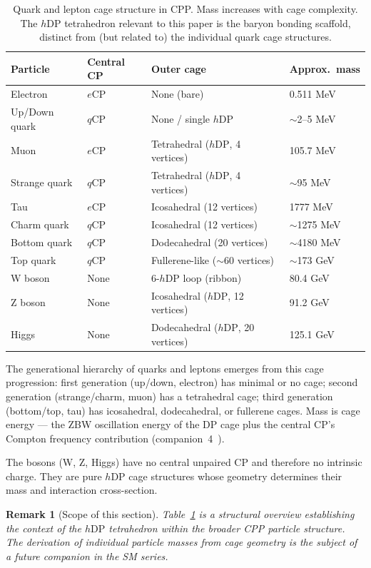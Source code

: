 \documentclass[12pt]{article}
\newtheorem{remark}[theorem]{Remark}
\newcommand{\eCP}{e\mathrm{CP}}
\newcommand{\qCP}{q\mathrm{CP}}
\newcommand{\hDP}{h\mathrm{DP}}
\begin{document}
\begin{table}[h]
\centering
\caption{Quark and lepton cage structure in CPP.  Mass increases
with cage complexity.  The $\hDP$ tetrahedron relevant to this
paper is the baryon bonding scaffold, distinct from (but related
to) the individual quark cage structures.}
\label{tab:cages}
\renewcommand{\arraystretch}{1.3}
\begin{tabular}{@{}llll@{}}
\toprule
Particle & Central CP & Outer cage & Approx.\ mass \\
\midrule
Electron & $\eCP$ & None (bare) & 0.511 MeV \\
Up/Down quark & $\qCP$ & None / single $\hDP$ & $\sim$2--5 MeV \\
Muon & $\eCP$ & Tetrahedral ($\hDP$, 4 vertices) & 105.7 MeV \\
Strange quark & $\qCP$ & Tetrahedral ($\hDP$, 4 vertices) & $\sim$95 MeV \\
Tau & $\eCP$ & Icosahedral (12 vertices) & 1777 MeV \\
Charm quark & $\qCP$ & Icosahedral (12 vertices) & $\sim$1275 MeV \\
Bottom quark & $\qCP$ & Dodecahedral (20 vertices) & $\sim$4180 MeV \\
Top quark & $\qCP$ & Fullerene-like ($\sim$60 vertices) & $\sim$173 GeV \\
\midrule
W boson & None & 6-$\hDP$ loop (ribbon) & 80.4 GeV \\
Z boson & None & Icosahedral ($\hDP$, 12 vertices) & 91.2 GeV \\
Higgs & None & Dodecahedral ($\hDP$, 20 vertices) & 125.1 GeV \\
\bottomrule
\end{tabular}
\end{table}

The generational hierarchy of quarks and leptons emerges from this
cage progression: first generation (up/down, electron) has minimal
or no cage; second generation (strange/charm, muon) has a
tetrahedral cage; third generation (bottom/top, tau) has icosahedral,
dodecahedral, or fullerene cages.  Mass is cage energy --- the ZBW
oscillation energy of the DP cage plus the central CP's Compton
frequency contribution (companion~4~\cite{c4}).

The bosons (W, Z, Higgs) have no central unpaired CP and therefore
no intrinsic charge.  They are pure $\hDP$ cage structures whose
geometry determines their mass and interaction cross-section.

\begin{remark}[Scope of this section]
Table~\ref{tab:cages} is a structural overview establishing the
context of the $\hDP$ tetrahedron within the broader CPP particle
structure.  The derivation of individual particle masses from cage
geometry is the subject of a future companion in the SM series.
\end{remark}
\end{document}
